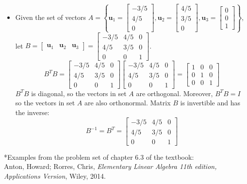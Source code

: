 \documentclass{article}
\begin{document}
\begin{itemize}
\item Given the set of vectors \(A = \left\{\mathbf{u}_1 = \begin{bmatrix} -3/5 \\ 4/5 \\ 0 \end{bmatrix}, \mathbf{u}_2 = \begin{bmatrix} 4/5 \\ 3/5 \\ 0 \end{bmatrix}, \mathbf{u}_3 = \begin{bmatrix} 0 \\ 0 \\ 1 \end{bmatrix}\right\}\), let \(B = \begin{bmatrix} \mathbf{u}_1 & \mathbf{u}_2 & \mathbf{u}_3 \end{bmatrix} = \begin{bmatrix} -3/5 & 4/5 & 0 \\ 4/5 & 3/5 & 0 \\ 0 & 0 & 1 \end{bmatrix}\). 
\[B^T B = \begin{bmatrix} -3/5 & 4/5 & 0 \\ 4/5 & 3/5 & 0 \\ 0 & 0 & 1 \end{bmatrix}\begin{bmatrix} -3/5 & 4/5 & 0 \\ 4/5 & 3/5 & 0 \\ 0 & 0 & 1 \end{bmatrix} = \begin{bmatrix} 1 & 0 & 0 \\ 0 & 1 & 0 \\ 0 & 0 & 1 \end{bmatrix}\]
\(B^T B\) is diagonal, so the vectors in set \(A\) are orthogonal. Moreover, \(B^T B = I\) so the vectors in set \(A\) are also orthonormal. Matrix \(B\) is invertible and has the inverse:
\[B^{-1} = B^T = \begin{bmatrix} -3/5 & 4/5 & 0 \\ 4/5 & 3/5 & 0 \\ 0 & 0 & 1 \end{bmatrix}\]
\end{itemize}

*Examples from the problem set of chapter 6.3 of the textbook: \\
Anton, Howard; Rorres, Chris, \emph{Elementary Linear Algebra 11th edition, Applications Version}, Wiley, 2014.
\end{document}
